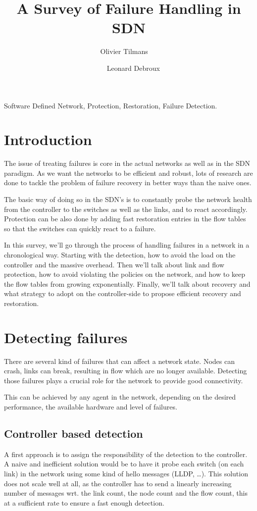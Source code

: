 \documentclass[compsoc]{IEEEtran}
\author{Olivier Tilmans ~~\and~~ Leonard Debroux}
\title{A Survey of Failure Handling in SDN}
\begin{document}
\maketitle
\begin{abstract}

\end{abstract}

\begin{IEEEkeywords}
Software Defined Network, Protection, Restoration, Failure Detection.
\end{IEEEkeywords}

\section{Introduction}
The issue of treating failures is core in the actual networks as well as in the SDN paradigm. As we want the networks to be efficient and robust, lots of research are done to tackle the problem of failure recovery in better ways than the naive ones.

The basic way of doing so in the SDN's is to constantly probe the network health from the controller to the switches as well as the links, and to react accordingly. Protection can be also done by adding fast restoration entries in the flow tables so that the switches can quickly react to a failure.

In this survey, we'll go through the process of handling failures in a network in a chronological way. Starting with the detection, how to avoid the load on the controller and the massive overhead. Then we'll talk about link and flow protection, how to avoid violating the policies on the network, and how to keep the flow tables from growing exponentially. Finally, we'll talk about recovery and what strategy to adopt on the controller-side to propose efficient recovery and restoration.

\section{Detecting failures}
There are several kind of failures that can affect a network state. Nodes can crash, links can break, resulting in flow which are no longer available. Detecting those failures plays a crucial role for the network to provide good connectivity.

This can be achieved by any agent in the network, depending on the desired performance, the available hardware and level of failures.

\subsection{Controller based detection}
A first approach is to assign the responsibility of the detection to the controller. A naive and inefficient solution would be to have it probe each switch (on each link) in the network using some kind of hello messages (LLDP, \ldots). This solution does not scale well at all, as the controller has to send a linearly increasing number of messages wrt. the link count, the node count and the flow count, this at a sufficient rate to ensure a fast enough detection.
\end{document}
